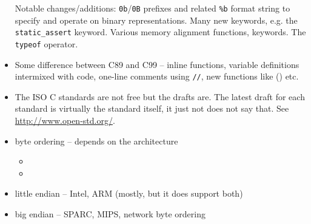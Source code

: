\begin{itemize}
Notable changes/additions: \texttt{0b}/\texttt{0B} prefixes and related
\texttt{\%b} format string to specify and operate on binary representations.
Many new keywords, e.g. the \texttt{static\_assert} keyword. Various memory
alignment functions, keywords. The \texttt{typeof} operator.
\item Some difference between C89 and C99 -- inline functions, variable
definitions intermixed with code, one-line comments using \texttt{//}, new
functions like () etc.
\item The ISO C standards are not free but the drafts are.  The latest draft for
each standard is virtually the standard itself, it just not does not say that.
See \url{http://www.open-std.org/}.
\end{itemize}


\begin{slide}
\begin{itemize}
\item byte ordering -- depends on the architecture
    \begin{itemize}
    \item {}
    \item {}
    \end{itemize}
\item little endian -- Intel, ARM (mostly, but it does support both)
\item big endian -- SPARC, MIPS, network byte ordering
\end{itemize}
\end{slide}


